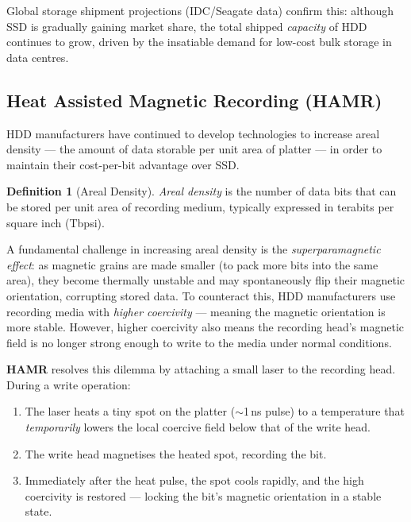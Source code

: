\documentclass[11pt, a4paper, notitlepage]{report}
\theoremstyle{definition}
\newtheorem{definition}[theorem]{Definition}
\theoremstyle{remark}
\theoremstyle{definition}
\begin{document}
Global storage shipment projections (IDC/Seagate data) confirm this: although SSD is gradually gaining market share, the total shipped \emph{capacity} of HDD continues to grow, driven by the insatiable demand for low-cost bulk storage in data centres.

\subsection{Heat Assisted Magnetic Recording (HAMR)}
\label{sec:hamr}

HDD manufacturers have continued to develop technologies to increase areal density — the amount of data storable per unit area of platter — in order to maintain their cost-per-bit advantage over SSD.

\begin{definition}[Areal Density]
  \label{def:areal-density}
  \emph{Areal density} is the number of data bits that can be stored per unit area of recording medium, typically expressed in terabits per square inch (Tbpsi).
\end{definition}

A fundamental challenge in increasing areal density is the \emph{superparamagnetic effect}: as magnetic grains are made smaller (to pack more bits into the same area), they become thermally unstable and may spontaneously flip their magnetic orientation, corrupting stored data. To counteract this, HDD manufacturers use recording media with \emph{higher coercivity} — meaning the magnetic orientation is more stable. However, higher coercivity also means the recording head's magnetic field is no longer strong enough to write to the media under normal conditions.

\textbf{HAMR} resolves this dilemma by attaching a small laser to the recording head. During a write operation:

\begin{enumerate}
  \item The laser heats a tiny spot on the platter ($\sim$1\,ns pulse) to a temperature that \emph{temporarily} lowers the local coercive field below that of the write head.
  \item The write head magnetises the heated spot, recording the bit.
  \item Immediately after the heat pulse, the spot cools rapidly, and the high coercivity is restored — locking the bit's magnetic orientation in a stable state.
\end{enumerate}
\end{document}
